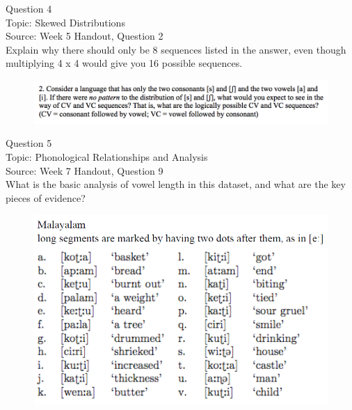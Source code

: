 \documentclass[12pt]{article}
\begin{document}
{\large Question 4}\\

Topic: Skewed Distributions\\
Source: Week 5 Handout, Question 2\\

Explain why there should only be 8 sequences listed in the answer, even though multiplying 4 x 4 would give you 16 possible sequences.\\

\begin{figure}[H]
\includegraphics{../images/skew2.png}
\end{figure}

\newpage

{\large Question 5}\\

Topic: Phonological Relationships and Analysis\\
Source: Week 7 Handout, Question 9\\

What is the basic analysis of vowel length in this dataset, and what are the key pieces of evidence?\\

\begin{figure}[H]
\includegraphics{../images/malayalam.png}
\end{figure}

\newpage

\begin{center}
\textbf{{\color{red}{\HUGE END OF EXAM}}}\\

\end{center}
\newpage
\end{document}
